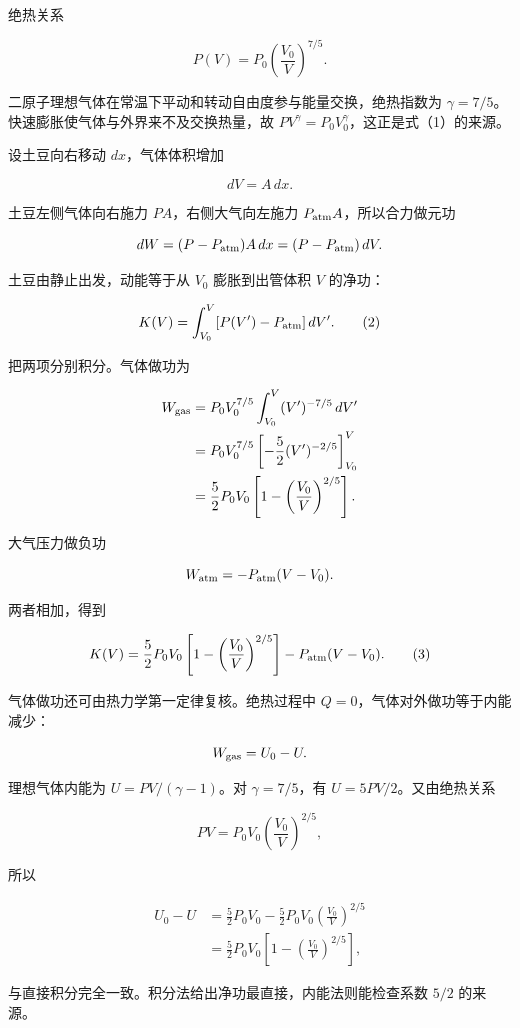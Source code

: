 \documentclass[12pt,a4paper,UTF8]{ctexart}
\begin{document}
绝热关系

\[
P(V)=P_0\left(\frac{V_0}{V}\right)^{7/5}.
\tag{1}
\]

二原子理想气体在常温下平动和转动自由度参与能量交换，绝热指数为
\(\gamma=7/5\)。快速膨胀使气体与外界来不及交换热量，故
\(PV^\gamma=P_0V_0^\gamma\)，这正是式（1）的来源。

设土豆向右移动 \(dx\)，气体体积增加

\[
dV=A\,dx.
\]

土豆左侧气体向右施力 \(PA\)，右侧大气向左施力
\(P_{\rm atm}A\)，所以合力做元功

\[
dW=(P-P_{\rm atm})A\,dx
=(P-P_{\rm atm})\,dV.
\]

土豆由静止出发，动能等于从 \(V_0\) 膨胀到出管体积 \(V\) 的净功：

\[
K(V)=\int_{V_0}^{V}
[P(V')-P_{\rm atm}]\,dV'.
\tag{2}
\]

把两项分别积分。气体做功为

\[
\begin{aligned}
W_{\rm gas}
&=P_0V_0^{7/5}\int_{V_0}^{V}(V')^{-7/5}\,dV'\\
&=P_0V_0^{7/5}
\left[-\frac52(V')^{-2/5}\right]_{V_0}^{V}\\
&=\frac52P_0V_0
\left[1-\left(\frac{V_0}{V}\right)^{2/5}\right].
\end{aligned}
\]

大气压力做负功

\[
W_{\rm atm}=-P_{\rm atm}(V-V_0).
\]

两者相加，得到

\[
K(V)
=\frac52P_0V_0
\left[1-\left(\frac{V_0}{V}\right)^{2/5}\right]
-P_{\rm atm}(V-V_0).
\tag{3}
\]

气体做功还可由热力学第一定律复核。绝热过程中
\(Q=0\)，气体对外做功等于内能减少：

\[
W_{\rm gas}=U_0-U.
\]

理想气体内能为 \(U=PV/(\gamma-1)\)。对 \(\gamma=7/5\)，有
\(U=5PV/2\)。又由绝热关系

\[
PV=P_0V_0\left(\frac{V_0}{V}\right)^{2/5},
\]

所以

\[
\begin{aligned}
U_0-U
&=\frac52P_0V_0
-\frac52P_0V_0
\left(\frac{V_0}{V}\right)^{2/5}\\
&=\frac52P_0V_0
\left[1-\left(\frac{V_0}{V}\right)^{2/5}\right],
\end{aligned}
\]

与直接积分完全一致。积分法给出净功最直接，内能法则能检查系数 \(5/2\)
的来源。
\end{document}
